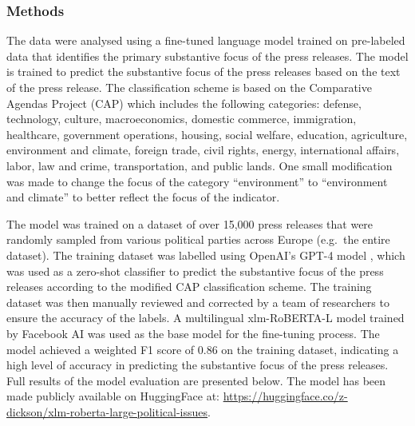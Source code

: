 \documentclass[
  letterpaper,
  DIV=11,
  numbers=noendperiod]{scrartcl}
\begin{document}
\subsubsection{Methods}\label{methods}

The data were analysed using a fine-tuned language model trained on
pre-labeled data that identifies the primary substantive focus of the
press releases. The model is trained to predict the substantive focus of
the press releases based on the text of the press release. The
classification scheme is based on the Comparative Agendas Project (CAP)
\citep{walgrave2019comparative} which includes the following categories:
defense, technology, culture, macroeconomics, domestic commerce,
immigration, healthcare, government operations, housing, social welfare,
education, agriculture, environment and climate, foreign trade, civil
rights, energy, international affairs, labor, law and crime,
transportation, and public lands. One small modification was made to
change the focus of the category ``environment'' to ``environment and
climate'' to better reflect the focus of the indicator.

The model was trained on a dataset of over 15,000 press releases that
were randomly sampled from various political parties across Europe
(e.g.~the entire dataset). The training dataset was labelled using
OpenAI's GPT-4 model \citep{achiam2023gpt}, which was used as a
zero-shot classifier to predict the substantive focus of the press
releases according to the modified CAP classification scheme. The
training dataset was then manually reviewed and corrected by a team of
researchers to ensure the accuracy of the labels. A multilingual
xlm-RoBERTA-L model trained by Facebook AI \citep{xlm_roberta} was used
as the base model for the fine-tuning process. The model achieved a
weighted F1 score of 0.86 on the training dataset, indicating a high
level of accuracy in predicting the substantive focus of the press
releases. Full results of the model evaluation are presented below. The
model has been made publicly available on HuggingFace at:
\url{https://huggingface.co/z-dickson/xlm-roberta-large-political-issues}.
\end{document}
